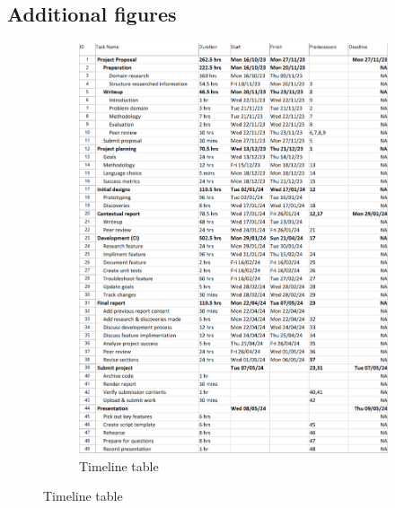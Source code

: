 
\subsection*{Additional figures}

\begin{figure}
    \vspace{-50px}
    \centering
    \caption{Project Timeline}
    \label{fig:ProjectTimeline}
    \begin{subfigure}[t]{0.5\textwidth}
        \caption{Timeline table}
        \label{fig:ProjectTimelineChart}
        \includegraphics[width=0.5\textheight]{Figures/TimelineChart.png}

\end{subfigure}
\end{figure}
